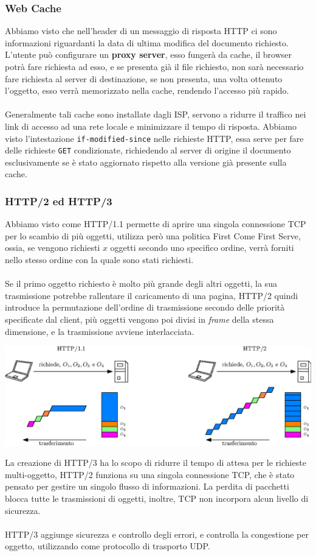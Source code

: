 \documentclass[12pt, letterpaper]{article}
\newcommand{\code}[1]{\colorbox{light-gray}{\texttt{#1}}}
\newcommand{\acc}{\\\hphantom{}\\}
\begin{document}
\subsubsection{Web Cache}
Abbiamo visto che nell'header di un messaggio di risposta HTTP ci sono informazioni riguardanti la data
di ultima modifica del documento richiesto. L'utente può configurare un \textbf{proxy server}, esso fungerà
da cache, il browser potrà fare richiesta ad esso, e se presenta già il file richiesto, non sarà
necessario fare richiesta al server di destinazione, se non presenta, una volta ottenuto l'oggetto, esso
verrà memorizzato nella cache, rendendo l'accesso più rapido.\acc
Generalmente tali cache sono installate dagli ISP, servono a ridurre il traffico nei link di accesso ad una rete
locale e minimizzare il tempo di risposta. Abbiamo visto l'intestazione \code{if-modified-since} nelle richieste
HTTP, essa serve per fare delle richieste \code{GET} condizionate, richiedendo al server di origine il
documento esclusivamente se è stato aggiornato rispetto alla versione già presente sulla cache.
\subsubsection{HTTP/2 ed HTTP/3}
Abbiamo visto come HTTP/1.1 permette di aprire una singola connessione TCP per lo scambio di più
oggetti, utilizza però una politica First Come First Serve, ossia, se vengono richiesti $x$ oggetti secondo
uno specifico ordine, verrà forniti nello stesso ordine con la quale sono stati richiesti.\acc
Se il primo oggetto richiesto è molto più grande degli altri oggetti, la sua trasmissione potrebbe
rallentare il caricamento di una pagina, HTTP/2 quindi introduce la permutazione dell'ordine di trasmissione
secondo delle priorità specificate dal client, più oggetti vengono poi divisi in \textit{frame} della
stessa dimensione, e la trasmissione avviene interlacciata.\begin{center}
    \includegraphics[width=1\textwidth ]{images/http2.eps}
\end{center}
La creazione di HTTP/3 ha lo scopo di ridurre il tempo di attesa per le richieste multi-oggetto, HTTP/2
funziona su una singola connessione TCP, che è stato pensato per gestire un singolo
flusso di informazioni. La perdita di pacchetti blocca tutte le trasmissioni di oggetti,
inoltre, TCP non incorpora alcun livello di sicurezza. \acc
HTTP/3 aggiunge sicurezza e controllo degli errori, e controlla la congestione per oggetto, utilizzando
come protocollo di trasporto UDP.
\end{document}
